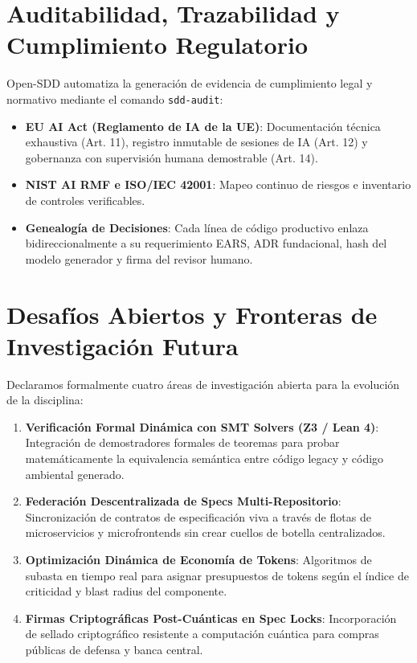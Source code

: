 \documentclass[11pt,a4paper]{article}
\begin{document}
\section{Auditabilidad, Trazabilidad y Cumplimiento Regulatorio}

Open-SDD automatiza la generación de evidencia de cumplimiento legal y normativo mediante el comando \texttt{sdd-audit}:
\begin{itemize}
    \item \textbf{EU AI Act (Reglamento de IA de la UE)}: Documentación técnica exhaustiva (Art. 11), registro inmutable de sesiones de IA (Art. 12) y gobernanza con supervisión humana demostrable (Art. 14).
    \item \textbf{NIST AI RMF e ISO/IEC 42001}: Mapeo continuo de riesgos e inventario de controles verificables.
    \item \textbf{Genealogía de Decisiones}: Cada línea de código productivo enlaza bidireccionalmente a su requerimiento EARS, ADR fundacional, hash del modelo generador y firma del revisor humano.
\end{itemize}

\section{Desafíos Abiertos y Fronteras de Investigación Futura}

Declaramos formalmente cuatro áreas de investigación abierta para la evolución de la disciplina:
\begin{enumerate}
    \item \textbf{Verificación Formal Dinámica con SMT Solvers (Z3 / Lean 4)}: Integración de demostradores formales de teoremas para probar matemáticamente la equivalencia semántica entre código legacy y código ambiental generado.
    \item \textbf{Federación Descentralizada de Specs Multi-Repositorio}: Sincronización de contratos de especificación viva a través de flotas de microservicios y microfrontends sin crear cuellos de botella centralizados.
    \item \textbf{Optimización Dinámica de Economía de Tokens}: Algoritmos de subasta en tiempo real para asignar presupuestos de tokens según el índice de criticidad y blast radius del componente.
    \item \textbf{Firmas Criptográficas Post-Cuánticas en Spec Locks}: Incorporación de sellado criptográfico resistente a computación cuántica para compras públicas de defensa y banca central.
\end{enumerate}
\end{document}

